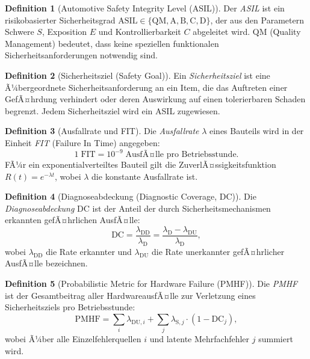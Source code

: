 ﻿\documentclass[a4paper,12pt]{article}
\theoremstyle{definition}
\newtheorem{definition}{Definition}
\begin{document}
\begin{definition}[Automotive Safety Integrity Level (ASIL)]
  Der \emph{ASIL} ist ein risikobasierter Sicherheitsgrad
  $\mathrm{ASIL} \in \{\text{QM}, \text{A}, \text{B}, \text{C}, \text{D}\}$,
  der aus den Parametern Schwere $S$, Exposition $E$ und
  Kontrollierbarkeit $C$ abgeleitet wird.
  $\mathrm{QM}$ (Quality Management) bedeutet, dass keine speziellen
  funktionalen Sicherheitsanforderungen notwendig sind.
\end{definition}

\begin{definition}[Sicherheitsziel (Safety Goal)]
  Ein \emph{Sicherheitsziel} ist eine Ã¼bergeordnete Sicherheitsanforderung
  an ein Item, die das Auftreten einer GefÃ¤hrdung verhindert oder deren
  Auswirkung auf einen tolerierbaren Schaden begrenzt.
  Jedem Sicherheitsziel wird ein ASIL zugewiesen.
\end{definition}

\begin{definition}[Ausfallrate und FIT]
  Die \emph{Ausfallrate} $\lambda$ eines Bauteils wird in der Einheit
  \emph{FIT} (Failure In Time) angegeben:
  \[
    1\;\mathrm{FIT} = 10^{-9}\;\text{AusfÃ¤lle pro Betriebsstunde.}
  \]
  FÃ¼r ein exponentialverteiltes Bauteil gilt die ZuverlÃ¤ssigkeitsfunktion
  $R(t) = e^{-\lambda t}$, wobei $\lambda$ die konstante Ausfallrate ist.
\end{definition}

\begin{definition}[Diagnoseabdeckung (Diagnostic Coverage, DC)]
  Die \emph{Diagnoseabdeckung} $\mathrm{DC}$ ist der Anteil der durch
  Sicherheitsmechanismen erkannten gefÃ¤hrlichen AusfÃ¤lle:
  \[
    \mathrm{DC}
    = \frac{\lambda_{\mathrm{DD}}}{\lambda_{\mathrm{D}}}
    = \frac{\lambda_{\mathrm{D}} - \lambda_{\mathrm{DU}}}{\lambda_{\mathrm{D}}},
  \]
  wobei $\lambda_{\mathrm{DD}}$ die Rate erkannter und
  $\lambda_{\mathrm{DU}}$ die Rate unerkannter gefÃ¤hrlicher AusfÃ¤lle
  bezeichnen.
\end{definition}

\begin{definition}[Probabilistic Metric for Hardware Failure (PMHF)]
  Die \emph{PMHF} ist der Gesamtbeitrag aller HardwareausfÃ¤lle zur
  Verletzung eines Sicherheitsziels pro Betriebsstunde:
  \[
    \mathrm{PMHF}
    = \sum_{i} \lambda_{\mathrm{DU},i}
    + \sum_{j} \lambda_{\mathrm{S},j} \cdot (1 - \mathrm{DC}_j),
  \]
  wobei Ã¼ber alle Einzelfehlerquellen $i$ und latente Mehrfachfehler
  $j$ summiert wird.
\end{definition}
\end{document}
